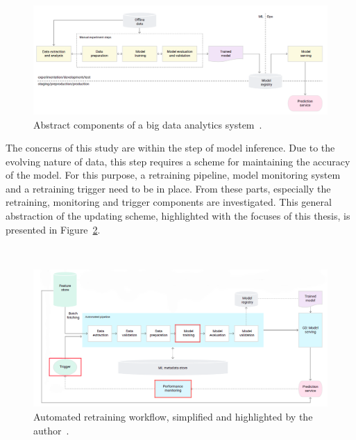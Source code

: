 \begin{figure}[hb]
\newline
\begin{center}
\includegraphics[width=1.0\columnwidth]{simplegoogle.png}
\caption{Abstract components of a big data analytics system~\cite{googlemlops}.}
\label{simplepipeline}
\end{center}
\end{figure}

The concerns of this study are within the step of model inference. Due to the evolving nature of data, this step requires a scheme for maintaining the accuracy of the model. For this purpose, a retraining pipeline, model monitoring system and a retraining trigger need to be in place. From these parts, especially the retraining, monitoring and trigger components are investigated. This general abstraction of the updating scheme, highlighted with the focuses of this thesis, is presented in Figure~\ref{triggerpipeline}.

\begin{figure}[ht]
\ \newline
\begin{center}
\includegraphics[width=1.0\columnwidth]{paivityssykli.png}
\caption{Automated retraining workflow, simplified and highlighted by the author~\cite{googlemlops}.}
\label{triggerpipeline}
\end{center}
\end{figure}


